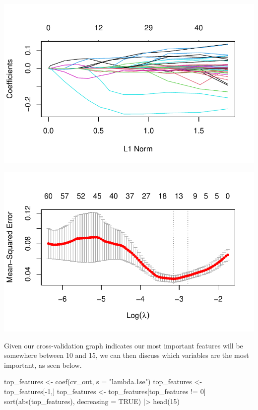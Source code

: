 \documentclass[
  letterpaper,
  DIV=11,
  numbers=noendperiod]{scrartcl}
\newenvironment{Shaded}{\begin{snugshade}}{\end{snugshade}}
\newcommand{\AttributeTok}[1]{\textcolor[rgb]{0.40,0.45,0.13}{#1}}
\newcommand{\ConstantTok}[1]{\textcolor[rgb]{0.56,0.35,0.01}{#1}}
\newcommand{\DecValTok}[1]{\textcolor[rgb]{0.68,0.00,0.00}{#1}}
\newcommand{\FunctionTok}[1]{\textcolor[rgb]{0.28,0.35,0.67}{#1}}
\newcommand{\NormalTok}[1]{\textcolor[rgb]{0.00,0.23,0.31}{#1}}
\newcommand{\OtherTok}[1]{\textcolor[rgb]{0.00,0.23,0.31}{#1}}
\newcommand{\SpecialCharTok}[1]{\textcolor[rgb]{0.37,0.37,0.37}{#1}}
\newcommand{\StringTok}[1]{\textcolor[rgb]{0.13,0.47,0.30}{#1}}
\begin{document}
\includegraphics{Episode_2_files/figure-pdf/lassosetup-1.pdf}

\includegraphics{Episode_2_files/figure-pdf/lassosetup-2.pdf}

Given our cross-validation graph indicates our most important features
will be somewhere between 10 and 15, we can then discuss which variables
are the most important, as seen below.

\begin{Shaded}
\begin{Highlighting}[]
\NormalTok{top\_features }\OtherTok{\textless{}{-}} \FunctionTok{coef}\NormalTok{(cv\_out, }\AttributeTok{s =} \StringTok{"lambda.1se"}\NormalTok{)}
\NormalTok{top\_features }\OtherTok{\textless{}{-}}\NormalTok{ top\_features[}\SpecialCharTok{{-}}\DecValTok{1}\NormalTok{,]}
\NormalTok{top\_features }\OtherTok{\textless{}{-}}\NormalTok{ top\_features[top\_features }\SpecialCharTok{!=} \DecValTok{0}\NormalTok{]}
\FunctionTok{sort}\NormalTok{(}\FunctionTok{abs}\NormalTok{(top\_features), }\AttributeTok{decreasing =} \ConstantTok{TRUE}\NormalTok{) }\SpecialCharTok{|\textgreater{}} \FunctionTok{head}\NormalTok{(}\DecValTok{15}\NormalTok{)}
\end{Highlighting}
\end{Shaded}
\end{document}
